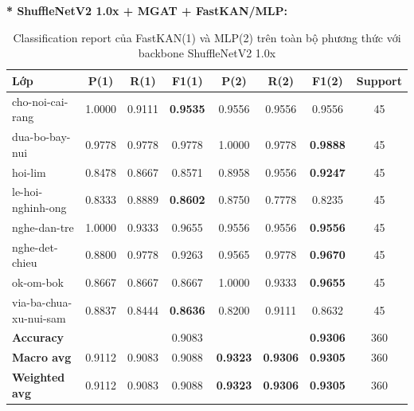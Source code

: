 \textbf{* ShuffleNetV2 1.0x + MGAT + FastKAN/MLP:}
\begin{table}[H]
\centering
\renewcommand{\arraystretch}{1.08}
\caption{\centering Classification report của FastKAN(1) và MLP(2) trên toàn bộ phương thức với backbone ShuffleNetV2 1.0x}
\begin{tabular}{lccccccc}
\hline
\textbf{Lớp} &
\textbf{P(1)} & \textbf{R(1)} & \textbf{F1(1)} &
\textbf{P(2)} & \textbf{R(2)} & \textbf{F1(2)} &
\textbf{Support} \\
\hline

cho-noi-cai-rang
& 1.0000 & 0.9111 & \textbf{0.9535}
& 0.9556 & 0.9556 & 0.9556 & 45 \\

dua-bo-bay-nui
& 0.9778 & 0.9778 & 0.9778
& 1.0000 & 0.9778 & \textbf{0.9888} & 45 \\

hoi-lim
& 0.8478 & 0.8667 & 0.8571
& 0.8958 & 0.9556 & \textbf{0.9247} & 45 \\

le-hoi-nghinh-ong
& 0.8333 & 0.8889 & \textbf{0.8602}
& 0.8750 & 0.7778 & 0.8235 & 45 \\

nghe-dan-tre
& 1.0000 & 0.9333 & 0.9655
& 0.9556 & 0.9556 & \textbf{0.9556} & 45 \\

nghe-det-chieu
& 0.8800 & 0.9778 & 0.9263
& 0.9565 & 0.9778 & \textbf{0.9670} & 45 \\

ok-om-bok
& 0.8667 & 0.8667 & 0.8667
& 1.0000 & 0.9333 & \textbf{0.9655} & 45 \\

via-ba-chua-xu-nui-sam
& 0.8837 & 0.8444 & \textbf{0.8636}
& 0.8200 & 0.9111 & 0.8632 & 45 \\
\hline

\textbf{Accuracy}
& & & 0.9083
& & & \textbf{0.9306} & 360 \\

\textbf{Macro avg}
& 0.9112 & 0.9083 & 0.9088
& \textbf{0.9323} & \textbf{0.9306} & \textbf{0.9305} & 360 \\

\textbf{Weighted avg}
& 0.9112 & 0.9083 & 0.9088
& \textbf{0.9323} & \textbf{0.9306} & \textbf{0.9305} & 360 \\
\hline
\end{tabular}
\end{table}

